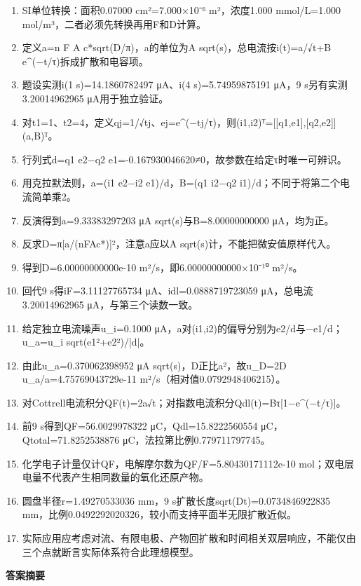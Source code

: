 \documentclass[UTF8,11pt,a4paper]{ctexart}
\begin{document}
\begin{enumerate}
\item SI单位转换：面积0.07000 cm²=7.000×10⁻⁶ m²，浓度1.000 mmol/L=1.000 mol/m³，二者必须先转换再用F和D计算。
\item 定义a=n F A c*sqrt(D/π)，a的单位为A sqrt(s)，总电流按i(t)=a/√t+B e\textasciicircum{}(−t/τ)拆成扩散和电容项。
\item 题设实测i(1 s)=14.1860782497 μA、i(4 s)=5.74959875191 μA，9 s另有实测3.20014962965 μA用于独立验证。
\item 对t1=1、t2=4，定义qj=1/√tj、ej=e\textasciicircum{}(−tj/τ)，则(i1,i2)ᵀ=[[q1,e1],[q2,e2]](a,B)ᵀ。
\item 行列式d=q1 e2−q2 e1=-0.167930046620≠0，故参数在给定τ时唯一可辨识。
\item 用克拉默法则，a=(i1 e2−i2 e1)/d，B=(q1 i2−q2 i1)/d；不同于将第二个电流简单乘2。
\item 反演得到a=9.33383297203 μA sqrt(s)与B=8.00000000000 μA，均为正。
\item 反求D=π[a/(nFAc*)]²，注意a应以A sqrt(s)计，不能把微安值原样代入。
\item 得到D=6.00000000000e-10 m²/s，即6.00000000000×10⁻¹⁰ m²/s。
\item 回代9 s得iF=3.11127765734 μA、idl=0.0888719723059 μA，总电流3.20014962965 μA，与第三个读数一致。
\item 给定独立电流噪声u\_i=0.1000 μA，a对(i1,i2)的偏导分别为e2/d与−e1/d；u\_a=u\_i sqrt(e1²+e2²)/|d|。
\item 由此u\_a=0.370062398952 μA sqrt(s)，D正比a²，故u\_D=2D u\_a/a=4.75769043729e-11 m²/s（相对值0.0792948406215）。
\item 对Cottrell电流积分QF(t)=2a√t；对指数电流积分Qdl(t)=Bτ[1−e\textasciicircum{}(−t/τ)]。
\item 前9 s得到QF=56.0029978322 μC，Qdl=15.8222560554 μC，Qtotal=71.8252538876 μC，法拉第比例0.779711797745。
\item 化学电子计量仅计QF，电解摩尔数为QF/F=5.80430171112e-10 mol；双电层电量不代表产生相同数量的氧化还原产物。
\item 圆盘半径r=1.49270533036 mm，9 s扩散长度sqrt(Dt)=0.0734846922835 mm，比例0.0492292020326，较小而支持平面半无限扩散近似。
\item 实际应用应考虑对流、有限电极、产物回扩散和时间相关双层响应，不能仅由三个点就断言实际体系符合此理想模型。
\end{enumerate}
\noindent\textbf{答案摘要}\par
\end{document}
